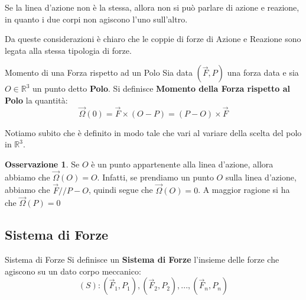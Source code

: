 \documentclass[11pt,a4paper,twoside]{article}
\theoremstyle{definition}
\newtheorem*{oss}{Osservazione}
\begin{document}
\begin{center}
\end{center}

Se la linea d'azione non è la stessa, allora non si può parlare di azione e reazione, in quanto i due corpi non agiscono l'uno sull'altro.
\begin{center}
\end{center}
Da queste considerazioni è chiaro che le coppie di forze di Azione e Reazione sono legata alla stessa tipologia di forze.

\begin{defn}{Momento di una Forza rispetto ad un Polo}{}
	Sia data $(\vec F, P)$ una forza data e sia $O \in \mathbb R^3$ un punto detto \textbf{Polo}. Si definisce \textbf{Momento della Forza rispetto al Polo} la quantità:
	\[ \vec \Omega(0) = \vec F \times (O-P) = (P-O) \times \vec F \]
\end{defn}

Notiamo subito che è definito in modo tale che vari al variare della scelta del polo in $\mathbb R^3$.

\begin{oss}
	Se $O$ è un punto appartenente alla linea d'azione, allora abbiamo che $\vec \Omega(O)=O$. Infatti, se prendiamo un punto $O$ sulla linea d'azione, abbiamo che $\vec F /\!/ P-O$, quindi segue che $\vec \Omega(O)=0$. A maggior ragione si ha che $\vec \Omega(P)=0$
\end{oss}

\subsection{Sistema di Forze}

\begin{defn}{Sistema di Forze}{}
	Si definisce un \textbf{Sistema di Forze} l'insieme delle forze che agiscono su un dato corpo meccanico:
	\[(S): (\vec F_1, P_1), (\vec F_2, P_2),...,(\vec F_n, P_n)\]
\end{defn}
\end{document}
